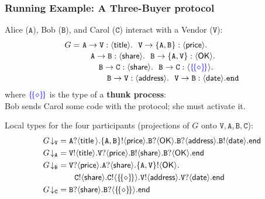 \documentclass[12pt]{beamer}
\newcommand{\sharedop}{\rightarrow}
\newcommand{\pS}{\ensuremath{\mathtt{V}}\xspace}
\newcommand{\thunkt}{\ensuremath\{\!\{\diamond\}\!\}}
\newcommand{\gtcom}[4]{\gpart{#1}\to\gpart{#2}:\langle #3\rangle.#4}
\newcommand{\gend}{\mathtt{end}}
\newcommand{\lend}{\mathsf{end}}
\newcommand{\gpart}[1]{\mathtt{#1}}
\newcommand{\shot}[1]{#1\! \sharedop\! \diamond}
\newcommand{\ltout}[3]{\gpart{#1}!\langle#2\rangle.#3}
\newcommand{\ltinp}[3]{\gpart{#1}?\langle#2\rangle.#3}
\newcommand{\tproj}[2]{#1\!\downarrow_{#2}}
\newcommand{\pA}{\ensuremath{\mathtt{A}}\xspace}
\newcommand{\pB}{\ensuremath{\mathtt{B}}\xspace}
\newcommand{\pC}{\ensuremath{\mathtt{C}}\xspace}
\begin{document}
\begin{frame}
\frametitle{Running Example: A Three-Buyer protocol }
\vspace{-2mm}
Alice (\pA), Bob (\pB), and Carol (\pC) interact with a Vendor (\pS):
\begin{align*}
G = ~&  \gtcom{A}{\pS}{\mathsf{title}}{~~\gtcom{\pS}{\{A,B\}}{\mathsf{price}}{\\[-0.5mm]
& \quad\gtcom{A}{B}{\mathsf{share}}{~~\gtcom{B}{\{A,\pS\}}{\mathsf{OK}}{
\\[-0.5mm]
& \quad\quad \gtcom{B}{C}{\mathsf{share}}{~~\gtcom{B}{C}{\textcolor{blue}{\thunkt}}{
\\[-0.5mm]
& \quad\qquad \gtcom{B}{\pS}{\mathsf{address}}{~~\gtcom{\pS}{B}{\mathsf{date}}{\gend}}}}}}}}
\end{align*}
where $\textcolor{blue}{\thunkt}$ is the type of a \textbf{thunk process}:\\ %
Bob sends Carol some code with the protocol; she must activate it.

\bigskip
\pause 
Local types for the 
four participants (projections of $G$ onto $\pS, \pA, \pB, \pC$):
\begin{align*}
\tproj{G}{\pS} & = \ltinp{A}{\mathsf{title}\,}{\ltout{\{A,B\}}{\mathsf{price}}{\ltinp{B}{\mathsf{OK}}{\ltinp{B}{\mathsf{address}}{\ltout{B}{\mathsf{date}}{\lend}}}}}
\\
\tproj{G}{\pA} & = \ltout{\pS}{\mathsf{title}}{\ltinp{\pS}{\mathsf{price}}{\ltout{B}{\mathsf{share}}{\ltinp{B}{\mathsf{OK}}{\lend}}}}
\\
\tproj{G}{\pB} & = \ltinp{\pS}{\mathsf{price}}{\ltinp{A}{\mathsf{share}}{\ltout{\{A,\pS\}}{\mathsf{OK}}{
\\
& \qquad
\ltout{C}{\mathsf{share}}{\ltout{C}{\thunkt}{
 \ltout{\pS}{\mathsf{address}}{\ltinp{\pS}{\mathsf{date}}{\lend}}}}}}}
\\
\tproj{G}{\pC} & = \ltinp{B}{\mathsf{share}}{\ltinp{B}{\thunkt}{\lend}}
\end{align*}

\end{frame}
\end{document}

